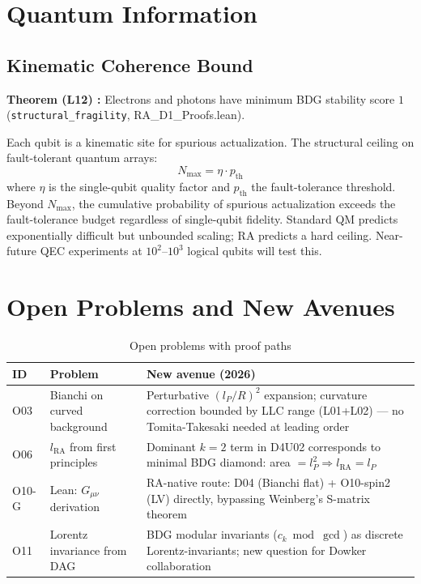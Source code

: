\documentclass[12pt,a4paper]{article}
\begin{document}
\section{Quantum Information}

\subsection{Kinematic Coherence Bound}

\begin{leanbox}
\textbf{Theorem (L12) \statusLV:} Electrons and photons have minimum BDG stability score $1$ (\texttt{structural\_fragility}, RA\_D1\_Proofs.lean).
\end{leanbox}

Each qubit is a kinematic site for spurious actualization.  The structural ceiling on fault-tolerant quantum arrays:
\begin{equation}
  N_{\max} = \eta \cdot p_{\mathrm{th}}
  \label{eq:kcb}
\end{equation}
where $\eta$ is the single-qubit quality factor and $p_{\mathrm{th}}$ the fault-tolerance threshold.  Beyond $N_{\max}$, the cumulative probability of spurious actualization exceeds the fault-tolerance budget regardless of single-qubit fidelity.  Standard QM predicts exponentially difficult but unbounded scaling; RA predicts a hard ceiling.  Near-future QEC experiments at $10^2$--$10^3$ logical qubits will test this.

\section{Open Problems and New Avenues}

\begin{table}[h]
\centering
\caption{Open problems with proof paths}
\label{tab:open}
\begin{tabular}{lp{5cm}p{6cm}}
\toprule
ID & Problem & New avenue (2026) \\
\midrule
O03 & Bianchi on curved background & Perturbative $(l_P/R)^2$ expansion; curvature correction bounded by LLC range (L01+L02) — no Tomita-Takesaki needed at leading order \\
O06 & $l_{\mathrm{RA}}$ from first principles & Dominant $k=2$ term in D4U02 corresponds to minimal BDG diamond: area $= l_P^2 \Rightarrow l_{\mathrm{RA}}=l_P$ \\
O10-G & Lean: $G_{\mu\nu}$ derivation & RA-native route: D04 (Bianchi flat) + O10-spin2 (LV) directly, bypassing Weinberg's S-matrix theorem \\
O11 & Lorentz invariance from DAG & BDG modular invariants ($c_k \bmod \gcd$) as discrete Lorentz-invariants; new question for Dowker collaboration \\
\bottomrule
\end{tabular}
\end{table}
\end{document}
